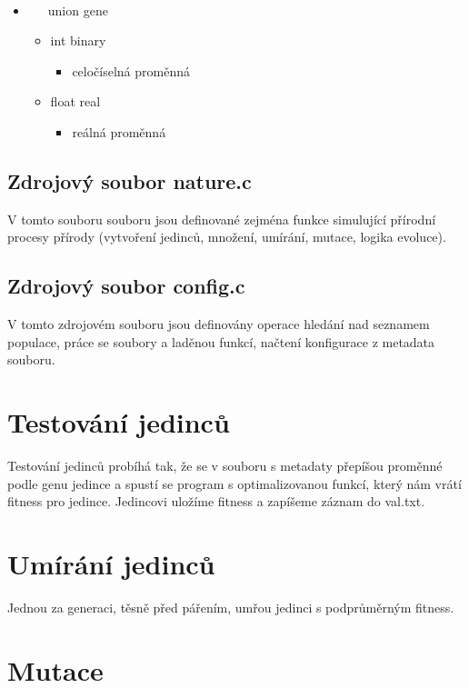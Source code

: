 \documentclass{article}
\begin{document}
 \ \ \ 
\begin{itemize}
\item  \ \ \ union gene
\begin{itemize}
\item int binary
\begin{itemize}
\item celočíselná proměnná
\end{itemize}
\item float real
\begin{itemize}
\item reálná proměnná
\end{itemize}
\end{itemize}
\end{itemize}

\subsection{Zdrojový soubor nature.c}

V tomto souboru souboru jsou definované zejména funkce simulující přírodní procesy přírody (vytvoření jedinců, množení, umírání, mutace, logika evoluce).


\subsection{Zdrojový soubor config.c}

V tomto zdrojovém souboru jsou definovány operace hledání nad seznamem populace, práce se soubory a laděnou funkcí, načtení konfigurace z metadata souboru.



\section{Testování jedinců}

Testování jedinců probíhá tak, že se v souboru s metadaty přepíšou proměnné podle genu jedince a spustí se program s optimalizovanou funkcí, který nám vrátí fitness pro jedince. Jedincovi uložíme fitness a zapíšeme záznam do val.txt.

\section{Umírání jedinců}

Jednou za generaci, těsně před pářením, umřou jedinci s podprůměrným fitness.

\section{Mutace}
\end{document}
